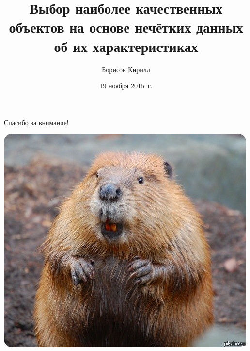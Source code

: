 



\title[Субъект. суждения и принятие решений]{Выбор наиболее качественных объектов на основе нечётких данных об их характеристиках}
\author{Борисов Кирилл}

\date{19 ноября 2015~г.}


\sloppy

\maketitle



%

\begin{frame}{Спасибо за внимание!}
	\begin{center}
		\includegraphics[width=0.5\linewidth]{./pic/biber_final}
	\end{center}
\end{frame}


